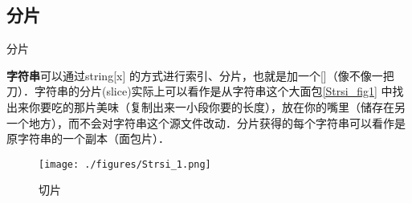 
\subsection{分片}
\begin{definition}{分片}

\textbf{字符串}可以通过string[x] 的方式进行索引、分片，也就是加一个[]（像不像一把刀）．字符串的分片(slice)实际上可以看作是从字符串这个大面包\autoref{Strsi_fig1} 中找出来你要吃的那片美味（复制出来一小段你要的长度），放在你的嘴里（储存在另一个地方），而不会对字符串这个源文件改动．分片获得的每个字符串可以看作是原字符串的一个副本（面包片）．
\begin{figure}[ht]
\centering
\texttt{[image: ./figures/Strsi\_1.png]}
\caption{切片} \label{Strsi_fig1}
\end{figure}

\end{definition}

